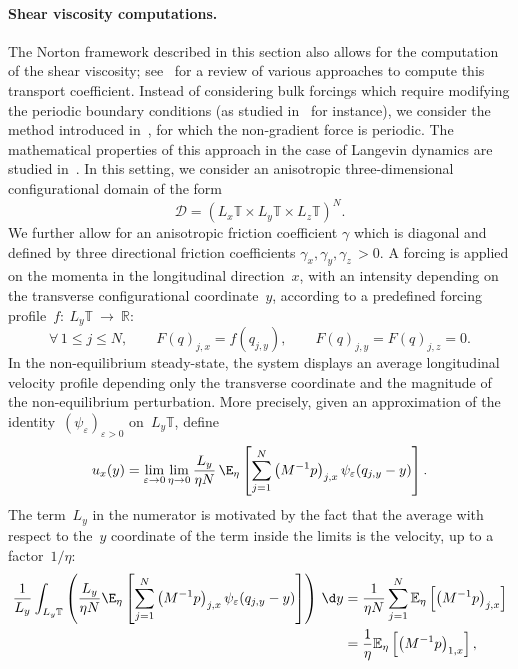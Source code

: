 \paragraph{Shear viscosity computations.}
The Norton framework described in this section also allows for the computation of the shear viscosity; see~\cite{TD07} for a review of various approaches to compute this transport coefficient. Instead of considering bulk forcings which require modifying the periodic boundary conditions (as studied in~\cite{D14} for instance), we consider the method introduced in~\cite{GMS73}, for which the non-gradient force is periodic. The mathematical properties of this approach in the case of Langevin dynamics are studied in~\cite{JS12}.
In this setting, we consider an anisotropic three-dimensional configurational domain of the form
\begin{equation}\label{04:eq:anisotropic_domain}\mathcal D = \left(L_x \mathbb{T} \times L_y\mathbb{T}\times L_z\mathbb{T}\right)^N.\end{equation}
We further allow for an anisotropic friction coefficient $\gamma$ which is diagonal and defined by three directional friction coefficients $\gamma_x, \gamma_y,\gamma_z\,> 0$.
A forcing is applied on the momenta in the longitudinal direction~$x$, with an intensity depending on the transverse configurational coordinate~$y$, according to a predefined forcing profile~$f:~L_y\mathbb{T}~\to~\mathbb{R}$:
\begin{equation}
\label{04:eq:shear_viscosity_forcing}
\forall\, 1\leq j\leq N,\qquad F(q)_{j,x}=f(q_{j,y}),\qquad F(q)_{j,y}=F(q)_{j,z} = 0.\end{equation}
In the non-equilibrium steady-state, the system displays an average longitudinal velocity profile depending only the transverse coordinate and the magnitude of the non-equilibrium perturbation.
More precisely, given an approximation of the identity~$\left(\psi_{\varepsilon}\right)_{\varepsilon>0}$ on~$L_y\mathbb T$, define
\begin{equation}
\label{04:eq:sv_response_profile}u_{x}(y)=\underset{\varepsilon\to 0}{\lim}\,\underset{\eta\to 0}{\lim}\, \frac{L_y}{\eta N}\,\E_\eta\left[\sum_{j=1}^N \left(M^{-1}p\right)_{j,x}\psi_{\varepsilon}(q_{j,y}-y)\right].\end{equation}
The term~$L_y$ in the numerator is motivated by the fact that the average with respect to the~$y$ coordinate of the term inside the limits is the velocity, up to a factor~$1/\eta$:
\[
\begin{aligned}  
\frac1{L_y}\int_{L_y\mathbb{T}} \left(\frac{L_y}{\eta N} \E_\eta\left[\sum_{j=1}^N \left(M^{-1}p\right)_{j,x} \psi_{\varepsilon}(q_{j,y} -y)\right]\right)\,\d y & = \frac1{\eta N}\sum_{j=1}^N \mathbb{E}_\eta\left[\left(M^{-1}p\right)_{j,x}\right] \\
& = \frac1{\eta} \mathbb{E}_\eta\left[\left(M^{-1}p\right)_{1,x}\right],
\end{aligned}
\]
